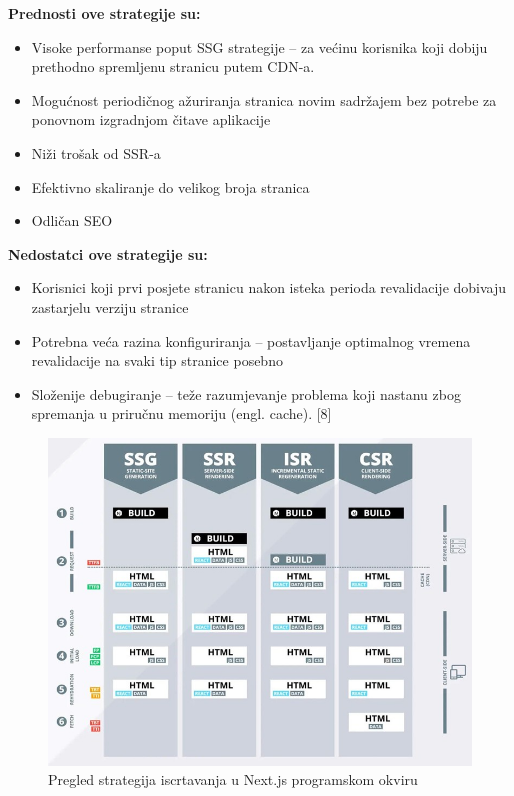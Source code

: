\bigskip

\textbf{Prednosti ove strategije su:}
\begin{itemize}
    \item Visoke performanse poput SSG strategije – za većinu korisnika koji dobiju prethodno spremljenu stranicu putem CDN-a.
    \item Mogućnost periodičnog ažuriranja stranica novim sadržajem bez potrebe za ponovnom izgradnjom čitave aplikacije
    \item Niži trošak od SSR-a
    \item Efektivno skaliranje do velikog broja stranica
    \item Odličan SEO
\end{itemize}

\bigskip

\textbf{Nedostatci ove strategije su:}

\begin{itemize}
    \item Korisnici koji prvi posjete stranicu nakon isteka perioda revalidacije dobivaju zastarjelu verziju stranice
    \item Potrebna veća razina konfiguriranja – postavljanje optimalnog vremena revalidacije na svaki tip stranice posebno
    \item Složenije debugiranje – teže razumjevanje problema koji nastanu zbog spremanja u priručnu memoriju (engl. cache). [8]
\end{itemize}


\begin{figure}[H]
    \centering
    \includegraphics[width=\textwidth]{slike/pregled-strategija-iscrtavanja.jpg}
    \caption{Pregled strategija iscrtavanja u Next.js programskom okviru}
    \label{fig:pregled-strategija-iscrtavanja}
\end{figure}

